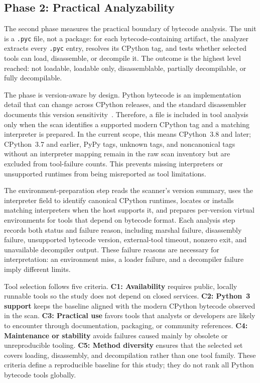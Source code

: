 \subsection{Phase 2: Practical Analyzability}\label{sec:method:source}

The second phase measures the practical boundary of bytecode analysis.  The unit is a \texttt{.pyc} file, not a package: for each bytecode-containing artifact, the analyzer extracts every \texttt{.pyc} entry, resolves its CPython tag, and tests whether selected tools can load, disassemble, or decompile it.  The outcome is the highest level reached: not loadable, loadable only, disassemblable, partially decompilable, or fully decompilable.

The phase is version-aware by design.  Python bytecode is an implementation detail that can change across CPython releases, and the standard disassembler documents this version sensitivity~\cite{python-dis}.  Therefore, a file is included in tool analysis only when the scan identifies a supported modern CPython tag and a matching interpreter is prepared.  In the current scope, this means CPython~3.8 and later; CPython~3.7 and earlier, PyPy tags, unknown tags, and noncanonical tags without an interpreter mapping remain in the raw scan inventory but are excluded from tool-failure counts.  This prevents missing interpreters or unsupported runtimes from being misreported as tool limitations.

The environment-preparation step reads the scanner's version summary, uses the interpreter field to identify canonical CPython runtimes, locates or installs matching interpreters when the host supports it, and prepares per-version virtual environments for tools that depend on bytecode format.  Each analysis step records both status and failure reason, including marshal failure, disassembly failure, unsupported bytecode version, external-tool timeout, nonzero exit, and unavailable decompiler output.  These failure reasons are necessary for interpretation: an environment miss, a loader failure, and a decompiler failure imply different limits.

Tool selection follows five criteria.  \textbf{C1: Availability} requires public, locally runnable tools so the study does not depend on closed services.  \textbf{C2: Python~3 support} keeps the baseline aligned with the modern CPython bytecode observed in the scan.  \textbf{C3: Practical use} favors tools that analysts or developers are likely to encounter through documentation, packaging, or community references.  \textbf{C4: Maintenance or stability} avoids failures caused mainly by obsolete or unreproducible tooling.  \textbf{C5: Method diversity} ensures that the selected set covers loading, disassembly, and decompilation rather than one tool family.  These criteria define a reproducible baseline for this study; they do not rank all Python bytecode tools globally.

